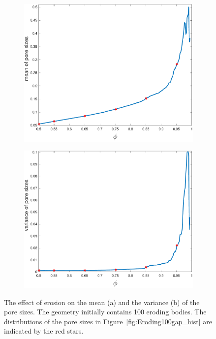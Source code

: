 \documentclass[preprint,10pt]{elsarticle}
\begin{document}
\begin{figure}[H]
\begin{subfigure}[b]{0.5\textwidth}
\includegraphics*[height = 0.8\linewidth]{./figs/gap_mean}
\caption{}
\end{subfigure}
\begin{subfigure}[b]{0.5\textwidth}
\includegraphics*[height=0.8\linewidth]{./figs/gap_variance}
\caption{}
\end{subfigure}
\caption{\label{fig:Eroding100gap_mean_var} The effect of erosion on the
mean (a) and the variance (b) of the pore sizes. The geometry initially
contains 100 eroding bodies.  The distributions of the pore sizes in
Figure~\ref{fig:Eroding100gap_hist} are indicated by the red stars.}
\end{figure}
\end{document}
